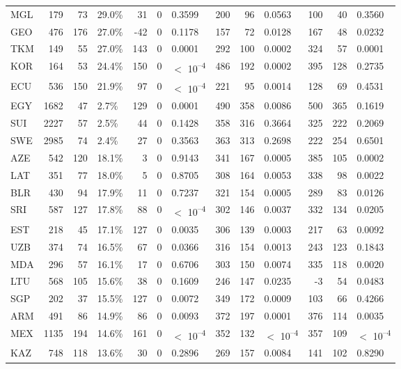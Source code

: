 \begin{tabular}[t]{lrrlrrlrrlrrl}
MGL & 179 & 73 & 29.0\% & 31 & 0 & 0.3599 & 200 & 96 & 0.0563 & 100 & 40 & 0.3560\\
GEO & 476 & 176 & 27.0\% & -42 & 0 & 0.1178 & 157 & 72 & 0.0128 & 167 & 48 & 0.0232\\
TKM & 149 & 55 & 27.0\% & 143 & 0 & 0.0001 & 292 & 100 & 0.0002 & 324 & 57 & 0.0001\\
KOR & 164 & 53 & 24.4\% & 150 & 0 & $<$ 10\textsuperscript{--4} & 486 & 192 & 0.0002 & 395 & 128 & 0.2735\\
ECU & 536 & 150 & 21.9\% & 97 & 0 & $<$ 10\textsuperscript{--4} & 221 & 95 & 0.0014 & 128 & 69 & 0.4531\\
EGY & 1682 & 47 & 2.7\% & 129 & 0 & 0.0001 & 490 & 358 & 0.0086 & 500 & 365 & 0.1619\\
SUI & 2227 & 57 & 2.5\% & 44 & 0 & 0.1428 & 358 & 316 & 0.3664 & 325 & 222 & 0.2069\\
SWE & 2985 & 74 & 2.4\% & 27 & 0 & 0.3563 & 363 & 313 & 0.2698 & 222 & 254 & 0.6501\\
AZE & 542 & 120 & 18.1\% & 3 & 0 & 0.9143 & 341 & 167 & 0.0005 & 385 & 105 & 0.0002\\
LAT & 351 & 77 & 18.0\% & 5 & 0 & 0.8705 & 308 & 164 & 0.0053 & 338 & 98 & 0.0022\\
BLR & 430 & 94 & 17.9\% & 11 & 0 & 0.7237 & 321 & 154 & 0.0005 & 289 & 83 & 0.0126\\
SRI & 587 & 127 & 17.8\% & 88 & 0 & $<$ 10\textsuperscript{--4} & 302 & 146 & 0.0037 & 332 & 134 & 0.0205\\
EST & 218 & 45 & 17.1\% & 127 & 0 & 0.0035 & 306 & 139 & 0.0003 & 217 & 63 & 0.0092\\
UZB & 374 & 74 & 16.5\% & 67 & 0 & 0.0366 & 316 & 154 & 0.0013 & 243 & 123 & 0.1843\\
MDA & 296 & 57 & 16.1\% & 17 & 0 & 0.6706 & 303 & 150 & 0.0074 & 335 & 118 & 0.0020\\
LTU & 568 & 105 & 15.6\% & 38 & 0 & 0.1609 & 246 & 147 & 0.0235 & -3 & 54 & 0.0483\\
SGP & 202 & 37 & 15.5\% & 127 & 0 & 0.0072 & 349 & 172 & 0.0009 & 103 & 66 & 0.4266\\
ARM & 491 & 86 & 14.9\% & 86 & 0 & 0.0093 & 372 & 197 & 0.0001 & 376 & 114 & 0.0035\\
MEX & 1135 & 194 & 14.6\% & 161 & 0 & $<$ 10\textsuperscript{--4} & 352 & 132 & $<$ 10\textsuperscript{--4} & 357 & 109 & $<$ 10\textsuperscript{--4}\\
KAZ & 748 & 118 & 13.6\% & 30 & 0 & 0.2896 & 269 & 157 & 0.0084 & 141 & 102 & 0.8290\\

\end{tabular}
